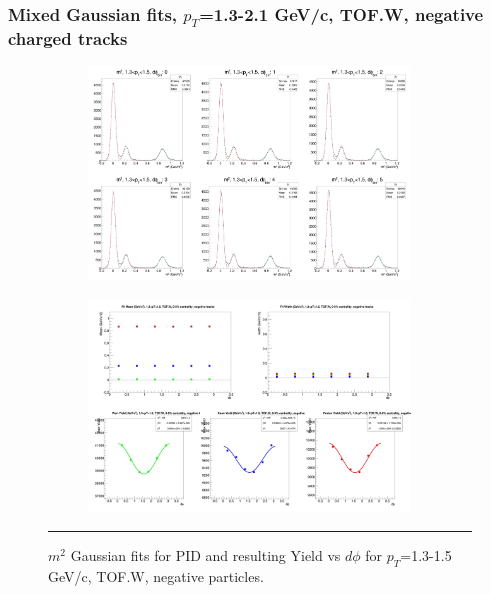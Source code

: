 \subsubsection{Mixed Gaussian fits, $p_T$=1.3-2.1 GeV/c, TOF.W, negative charged tracks}
\label{app:mixgauss}
\begin{figure}[H]
  \centering
    \begin{subfigure}{1\textwidth}
   \centering
   \includegraphics[width=0.94\textwidth]{lowptfits/yieldvsdphi_tof1_cent0_ch0_pT-13-15.jpg}
    \end{subfigure}
    \begin{subfigure}{1\textwidth}
   \centering
   \includegraphics[width=0.94\textwidth]{lowptfits/fitParams_tof1_cent0_ch0_pT-13-15.jpg}
    \end{subfigure}
    \rule{35em}{0.5pt}
  \caption[PID fits and Yield vs $d\phi$ for $p_T$=1.3-1.5 GeV/c, TOF.W, negative particles. ]{$m^2$ Gaussian fits for PID and resulting Yield vs $d\phi$ for $p_T$=1.3-1.5 GeV/c, TOF.W, negative particles.}
  \label{fig:fits13-15neg}
\end{figure}

